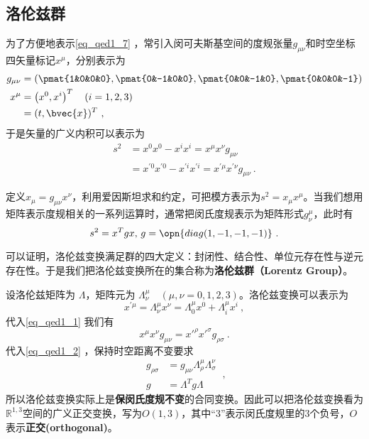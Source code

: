 \subsection{洛伦兹群}
为了方便地表示\autoref{eq_qed1_7} ，常引入闵可夫斯基空间的度规张量$g_{\mu\nu}$和时空坐标四矢量标记$x^{\mu}$，分别表示为
\begin{equation}
\begin{aligned}
g_{\mu \nu}&=(\pmat{1&0&0&0},\pmat{0&-1&0&0},\pmat{0&0&-1&0},\pmat{0&0&0&-1})\\
x^{\mu} &=\left(x^{0}, x^{i}\right)^T \quad(i=1,2,3)\\
&=(t, \bvec{x})^T~,
\end{aligned}
\end{equation}
于是矢量的广义内积可以表示为
\begin{equation}\label{eq_qed1_1}\begin{aligned}
s^{2} &=x^{0} x^{0}-x^{i} x^{i}=x^{\mu} x^{\nu} g_{\mu \nu} \\
&=x^{\prime 0} x^{\prime 0}-x^{\prime i} x^{\prime i}=x^{\prime \mu} x^{\prime \nu} g_{\mu \nu}~.\end{aligned}\end{equation}

定义$x_{\mu}=g_{\mu\nu}x^{\nu}$，利用爱因斯坦求和约定，可把模方表示为$s^2=x_{\mu}x^{\mu}$。当我们想用矩阵表示度规相关的一系列运算时，通常把闵氏度规表示为矩阵形式$g^{\mu}_{\nu}$，此时有
\begin{equation}
s^2=x^Tgx,\,g=\opn{diag(1,-1,-1,-1)}~.
\end{equation}



可以证明，洛伦兹变换满足群的四大定义：封闭性、结合性、单位元存在性与逆元存在性。于是我们把洛伦兹变换所在的集合称为\textbf{洛伦兹群（Lorentz Group）}。



设洛伦兹矩阵为 $\Lambda$，矩阵元为 $\Lambda_{\nu}^{\mu}\quad(\mu,\nu=0,1,2,3)$。洛伦兹变换可以表示为
\begin{equation}\label{eq_qed1_2}x^{\prime \mu}=\Lambda_{\nu}^{\mu} x^{\nu}=\Lambda_{0}^{\mu} x^{0}+\Lambda_{i}^{\mu} x^{i}~,\end{equation}
代入\autoref{eq_qed1_1} 我们有
\begin{equation}
x^{\mu} x^{\nu} g_{\mu \nu}=x'^{\rho} x'^{\sigma} g_{\rho \sigma}~.
\end{equation}
代入\autoref{eq_qed1_2} ，保持时空距离不变要求
\begin{equation}\label{eq_qed1_3}
\begin{aligned}
g_{\rho \sigma}&=g_{\mu \nu} \Lambda_{\rho}^{\mu} \Lambda_{\sigma}^{\nu}\\
g&=\Lambda^Tg\Lambda
\end{aligned}~,
\end{equation}
所以洛伦兹变换实际上是\textbf{保闵氏度规不变}的合同变换。因此可以把洛伦兹变换看为$\mathbb R^{1,3}$空间的广义正交变换，写为$O(1,3)$，其中“3”表示闵氏度规里的3个负号，$O$表示\textbf{正交(orthogonal)}。

